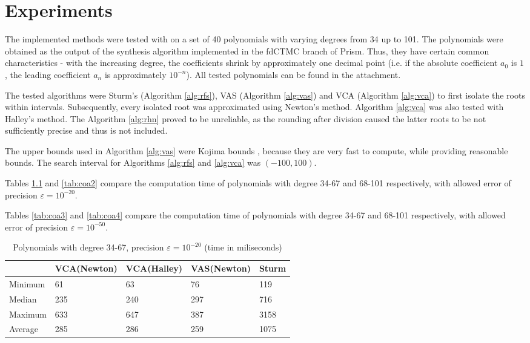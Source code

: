 \documentclass[
  digital, %
  notable,   %
  nolof,     %
  nolot,     %
	final, %
]{fithesis3}
\begin{document}
\chapter{Experiments}
The implemented methods were tested with on a set of 40 polynomials with varying degrees from 34 up to 101. The polynomials were obtained as the output of the synthesis algorithm implemented in the fdCTMC branch of Prism. Thus, they have certain common characteristics - with the increasing degree, the coefficients shrink by approximately one decimal point (i.e. if the absolute coefficient $a_{0}$ is $1$, the leading coefficient $a_{n}$ is approximately $10^{-n}$). All tested polynomials can be found in the attachment.

The tested algorithms were Sturm's (Algorithm \ref{alg:rfs}), VAS (Algorithm \ref{alg:vas}) and VCA (Algorithm \ref{alg:vca}) to first isolate the roots within intervals. Subsequently, every isolated root was approximated using Newton's method. Algorithm \ref{alg:vca} was also tested with Halley's method. The Algorithm \ref{alg:rhn} proved to be unreliable, as the rounding after division caused the latter roots to be not sufficiently precise and thus is not included.

The upper bounds used in Algorithm \ref{alg:vas} were Kojima bounds \parencite{kojima}, because they are very fast to compute, while providing reasonable bounds. The search interval for Algorithms \ref{alg:rfs} and \ref{alg:vca} was $(-100, 100)$.

Tables \ref{tab:coa1} and \ref{tab:coa2} compare the computation time of polynomials with degree 34-67 and 68-101 respectively, with allowed error of precision $\varepsilon = 10^{-20}$. 

Tables \ref{tab:coa3} and \ref{tab:coa4} compare the computation time of polynomials with degree 34-67 and 68-101 respectively, with allowed error of precision $\varepsilon = 10^{-50}$. 

\begin{table}
  \begin{tabular*}{\textwidth}{lllll}
    \toprule
     & VCA(Newton) & VCA(Halley) & VAS(Newton) & Sturm \\
    \midrule
			Minimum & 61 & 63 & 76 & 119 \\
			Median & 235 & 240 & 297 & 716 \\
			Maximum & 633 & 647 & 387 & 3158 \\
			Average & 285 & 286 & 259 & 1075 \\
    \bottomrule
  \end{tabular*}
  \caption{Polynomials with degree 34-67, precision $\varepsilon = 10^{-20}$ (time in miliseconds)}
  \label{tab:coa1}
\end{table}
\end{document}
